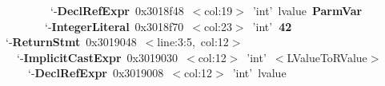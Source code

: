 {\color[rgb]{0,0,0.93}\ \ \ \ \textbar \ \ \ \ \ \ \ \textbar \ `{-}}{\bfseries{}\stmt DeclRefExpr}{\ptr\ 0x3018f48}\ $<${\sloc col:19}$>$\ {\color[rgb]{0,0.8,0}'int'}{\color[rgb]{0,0.8,0.8}\ lvalue}{\color[rgb]{0,0.8,0.8}}\ {\bfseries{}\decl ParmVar}{\ }\\%
{\color[rgb]{0,0,0.93}\ \ \ \ \textbar \ \ \ \ \ \ \ `{-}}{\bfseries{}\stmt IntegerLiteral}{\ptr\ 0x3018f70}\ $<${\sloc col:23}$>$\ {\color[rgb]{0,0.8,0}'int'}{\color[rgb]{0,0.8,0.8}}{\color[rgb]{0,0.8,0.8}}{\bfseries{}\token\ 42}\hspace*{\fill}\\
{\color[rgb]{0,0,0.93}\ \ \ \ `{-}}{\bfseries{}\stmt ReturnStmt}{\ptr\ 0x3019048}\ $<${\sloc line:3:5},\ {\sloc col:12}$>$\hspace*{\fill}\\
{\color[rgb]{0,0,0.93}\ \ \ \ \ \ `{-}}{\bfseries{}\stmt ImplicitCastExpr}{\ptr\ 0x3019030}\ $<${\sloc col:12}$>$\ {\color[rgb]{0,0.8,0}'int'}{\color[rgb]{0,0.8,0.8}}{\color[rgb]{0,0.8,0.8}}\ $<${\color[rgb]{0.8,0,0}LValueToRValue}$>$\hspace*{\fill}\\
{\color[rgb]{0,0,0.93}\ \ \ \ \ \ \ \ `{-}}{\bfseries{}\stmt DeclRefExpr}{\ptr\ 0x3019008}\ $<${\sloc col:12}$>$\ {\color[rgb]{0,0.8,0}'int'}{\color[rgb]{0,0.8,0.8}\ lvalue}{\color[rgb]{0,0.8,0.8}}\  %
